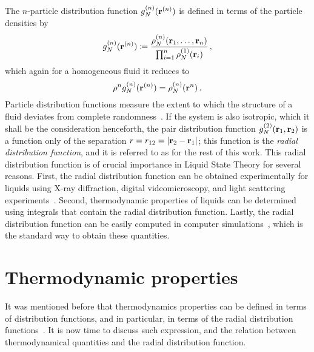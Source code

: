 The $n$-particle distribution function $g^{(n)}_{N} (\mathbf{r}^{(n)})$ is defined in terms
of the particle densities by
\begin{equation}
    g^{(n)}_{N} (\mathbf{r}^{(n)}) \coloneqq \frac{\rho^{(n)}_{N} (\mathbf{r}_{1}, \dots , \mathbf{r}_{n})}
    {\prod_{i=1}^{n} \rho^{(1)}_{N} (\mathbf{r}_{i})} \, ,
    \label{eq:gr-def}
\end{equation}
which again for a homogeneous fluid it reduces to
\begin{equation}
    \rho^{n} g^{(n)}_{N} (\mathbf{r}^{(n)}) = \rho^{(n)}_{N} (\mathbf{r}^{n}) \, .
    \label{eq:homogenous-gr}
\end{equation}
Particle distribution functions measure the extent to which the structure of a fluid 
deviates from complete randomness~\cite{hansenTheorySimpleLiquids2013}.
If the system is also isotropic, which it shall be the consideration henceforth,
the pair distribution function $g^{(2)}_{N} (\mathbf{r}_{1}, \mathbf{r}_{2})$ is a function only
of the separation $r = r_{12} = \lvert \mathbf{r}_{2} - \mathbf{r}_{1} \rvert$;
this function is the \emph{radial distribution function}, and it is referred
to as \rdf for the rest of this work.
This radial distribution function is of crucial importance in Liquid State Theory for
several reasons. First, the radial distribution function can be obtained experimentally
for liquids using X-ray diffraction, digital videomicroscopy, and light scattering
experiments~\cite{mcquarrieStatisticalMechanics2000}.
Second, thermodynamic properties of liquids can be determined using integrals that
contain the radial distribution function. Lastly, the radial distribution function can
be easily computed in computer simulations~\cite{allenComputerSimulationLiquids2017}, 
which is the standard way to obtain these quantities.

\section{Thermodynamic properties}

It was mentioned before that thermodynamics properties can be defined in terms of
distribution functions, and in particular, in terms of the radial distribution
functions~\cite{hansenTheorySimpleLiquids2013}.
It is now time to discuss such expression, and the relation between thermodynamical
quantities and the radial distribution function.

